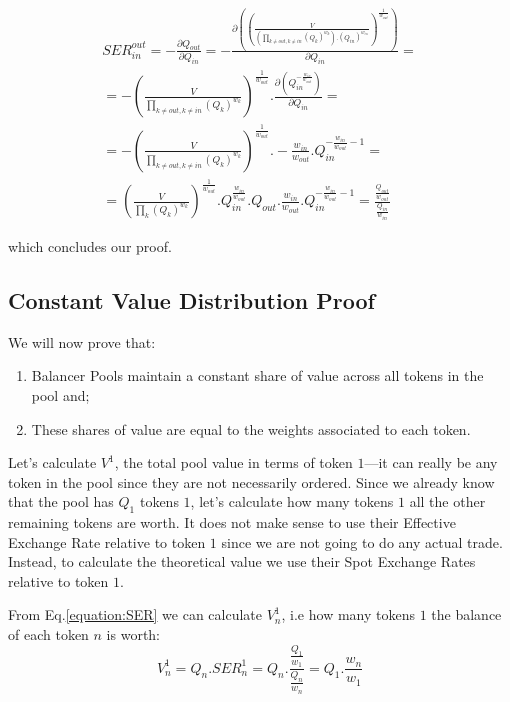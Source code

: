 \documentclass[11pt]{amsart}
\begin{document}
\begin{equation}
\begin{gathered}
SER^{out}_{in} = 
-\frac{\partial Q_{out}}{\partial Q_{in}} =
-\frac{\partial{\left(\left(\frac{V}{\left(\prod_{k\neq out, k\neq in}(Q_k)^{w_k}\right).(Q_{in})^{w_{in}}}\right)^\frac{1}{w_{out}}\right)}}{\partial Q_{in}}  =\\
=-\left(\frac{V}{\prod_{k\neq out, k\neq in}(Q_k)^{w_k}}\right)^\frac{1}{w_{out}}
.
\frac{\partial{\left(Q_{in}^{-\frac{w_{in}}{w_{out}}}\right)}}{\partial Q_{in}} =\\
=-\left(\frac{V}{\prod_{k\neq out, k\neq in}(Q_k)^{w_k}}\right)^\frac{1}{w_{out}}
.
-\frac{w_{in}}{w_{out}}.Q_{in}^{-\frac{w_{in}}{w_{out}}-1} =\\
=\left(\frac{V}{\prod_{k}(Q_k)^{w_k}}\right)^\frac{1}{w_{out}}
.Q_{in}^{\frac{w_{in}}{w_{out}}}.Q_{out}
.\frac{w_{in}}{w_{out}}.Q_{in}^{-\frac{w_{in}}{w_{out}}-1} = \frac{\frac{Q_{out}}{w_{out}}}{\frac{Q_{in}}{w_{in}}}
\end{gathered}
\end{equation}

which concludes our proof.

\subsection{Constant Value Distribution Proof}
We will now prove that: 
\begin{enumerate}
    \item Balancer Pools maintain a constant share of value across all tokens in the pool and;
    \item These shares of value are equal to the weights associated to each token.
\end{enumerate}

Let's calculate $V^1$, the total pool value in terms of token $1$---it can really be any token in the pool since they are not necessarily ordered. Since we already know that the pool has $Q_1$ tokens $1$, let's calculate how many tokens $1$ all the other remaining tokens are worth. It does not make sense to use their Effective Exchange Rate relative to token $1$ since we are not going to do any actual trade. Instead, to calculate the theoretical value we use their Spot Exchange Rates relative to token $1$.

From Eq.\ref{equation:SER} we can calculate $V^1_n$, i.e how many tokens $1$ the balance of each token $n$ is worth:
\begin{equation} 
\label{equation:value_in_tokens1}
V^1_n = Q_{n} . SER^{1}_{n} = Q_{n} . \frac{\frac{Q_{1}}{w_{1}}}{\frac{Q_{n}}{w_{n}}} = 
Q_{1}.\frac{w_{n}}{w_{1}}
\end{equation}
\end{document}

